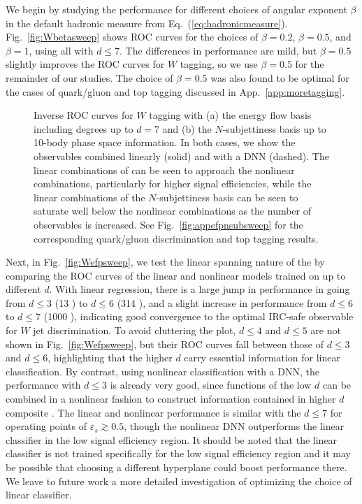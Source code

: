 \documentclass[letterpaper,11pt]{article}
\DeclareRobustCommand{\App}[1]{App.~\ref{#1}}
\DeclareRobustCommand{\Fig}[1]{Fig.~\ref{#1}}
\DeclareRobustCommand{\Eq}[1]{Eq.~(\ref{#1})}
\newcommand{\Bs}{\text{EFPs}\xspace}
\begin{document}
We begin by studying the performance for different choices of angular exponent $\beta$ in the default hadronic measure from \Eq{eq:hadronicmeasure}.
%
\Fig{fig:Wbetasweep} shows ROC curves for the choices of $\beta=0.2$, $\beta=0.5$, and $\beta=1$, using all \Bs with $d \le 7$.
%
The differences in performance are mild, but $\beta=0.5$ slightly improves the ROC curves for $W$ tagging, so we use $\beta = 0.5$ for the remainder of our studies.
%
The choice of $\beta = 0.5$ was also found to be optimal for the cases of quark/gluon and top tagging discussed in \App{app:moretagging}.

\begin{figure}[t]
\centering
{}
\caption{Inverse ROC curves for $W$ tagging with (a) the energy flow basis including degrees up to $d=7$ and (b) the $N$-subjettiness basis up to 10-body phase space information.  In both cases, we show the observables combined linearly (solid) and with a DNN (dashed).  The linear combinations of \Bs can be seen to approach the nonlinear combinations, particularly for higher signal efficiencies, while the linear combinations of the $N$-subjettiness basis can be seen to saturate well below the nonlinear combinations as the number of observables is increased. See \Fig{fig:appefpnsubsweep} for the corresponding quark/gluon discrimination and top tagging results.}
\label{fig:Wefpnsubsweep}
\end{figure}

Next, in \Fig{fig:Wefpsweep}, we test the linear spanning nature of the \Bs by comparing the ROC curves of the linear and nonlinear models trained on \Bs up to different $d$.
%
With linear regression, there is a large jump in performance in going from $d\le3$ (13 \Bs) to $d\le6$ (314 \Bs), and a slight increase in performance from $d\le6$ to $d\le7$ (1000 \Bs), indicating good convergence to the optimal IRC-safe observable for $W$ jet discrimination.
%
To avoid cluttering the plot, $d\le4$ and $d\le5$ are not shown in \Fig{fig:Wefpsweep}, but their ROC curves fall between those of $d\le3$ and $d\le6$, highlighting that the higher $d$ \Bs carry essential information for linear classification. 
%
By contrast, using nonlinear classification with a DNN, the \Bs performance with $d \le 3$ is already very good, since functions of the low $d$ \Bs can be combined in a nonlinear fashion to construct information contained in higher $d$ composite \Bs.
%
The linear and nonlinear performance is similar with the $d\le7$ \Bs for operating points of $\varepsilon_s\gtrsim0.5$, though the nonlinear DNN outperforms the linear classifier in the low signal efficiency region.
%
It should be noted that the linear classifier is not trained specifically for the low signal efficiency region and it may be possible that choosing a different hyperplane could boost performance there.
%
We leave to future work a more detailed investigation of optimizing the choice of linear classifier.
\end{document}
